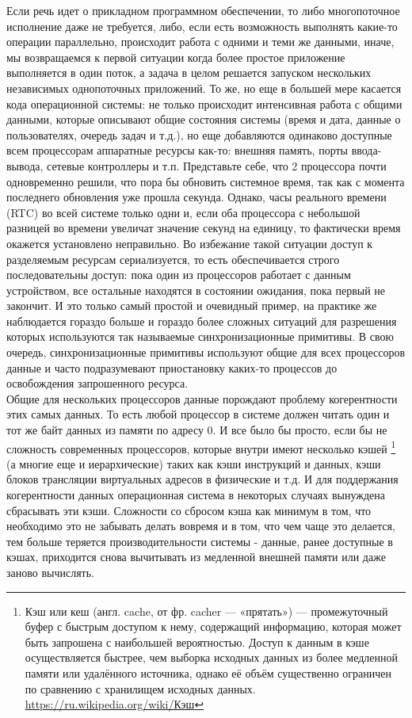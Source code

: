 \documentclass[14pt, a4paper]{article}
\begin{document}
Если речь идет о прикладном программном обеспечении, то либо многопоточное
исполнение даже не требуется, либо, если есть возможность выполнять какие-то
операции параллельно, происходит работа с одними и теми же данными, иначе, мы
возвращаемся к первой ситуации когда более простое приложение выполняется в один
поток, а задача в целом решается запуском нескольких независимых однопоточных
приложений. То же, но еще в большей мере касается кода операционной системы: не
только происходит интенсивная работа с общими данными, которые описывают общие
состояния системы (время и дата, данные о пользователях, очередь задач и т.д.), но
еще добавляются одинаково доступные всем процессорам аппаратные ресурсы как-то:
внешняя память, порты ввода-вывода, сетевые контроллеры и т.п. Представьте себе,
что 2 процессора почти одновременно решили, что пора бы обновить системное
время, так как с момента последнего обновления уже прошла секунда. Однако, часы
реального времени (RTC) во всей системе только одни и, если оба процессора с
небольшой разницей во времени увеличат значение секунд на единицу, то фактически
время окажется установлено неправильно. Во избежание такой ситуации доступ к
разделяемым ресурсам сериализуется, то есть обеспечивается строго
последовательны доступ: пока один из процессоров работает с данным устройством,
все остальные находятся в состоянии ожидания, пока первый не закончит. И это
только самый простой и очевидный пример, на практике же наблюдается гораздо
больше и гораздо более сложных ситуаций для разрешения которых используются так
называемые синхронизационные примитивы. В свою очередь, синхронизационные
примитивы используют общие для всех процессоров данные и часто подразумевают
приостановку каких-то процессов до освобождения запрошенного ресурса.\\

Общие для нескольких процессоров данные порождают проблему когерентности этих
самых данных. То есть любой процессор в системе должен читать один и тот же байт
данных из памяти по адресу 0. И все было бы просто, если бы не сложность
современных процессоров, которые внутри имеют несколько кэшей \footnote{Кэш или кеш (англ. cache, от фр. cacher — «прятать») — промежуточный буфер с быстрым
доступом к нему, содержащий информацию, которая может быть запрошена с наибольшей
вероятностью. Доступ к данным в кэше осуществляется быстрее, чем выборка исходных
данных из более медленной памяти или удалённого источника, однако её объём существенно
ограничен по сравнению с хранилищем исходных данных. \\ \href{https://ru.wikipedia.org/wiki/Кэш}{https://ru.wikipedia.org/wiki/Кэш}} 
(а многие еще и иерархические) таких как кэши инструкций и данных, кэши блоков трансляции
виртуальных адресов в физические и т.д. И для поддержания когерентности данных
операционная система в некоторых случаях вынуждена сбрасывать эти кэши.
Сложности со сбросом кэша как минимум в том, что необходимо это не забывать
делать вовремя и в том, что чем чаще это делается, тем больше теряется
производительности системы - данные, ранее доступные в кэшах, приходится снова
вычитывать из медленной внешней памяти или даже заново вычислять.\\
\end{document}
